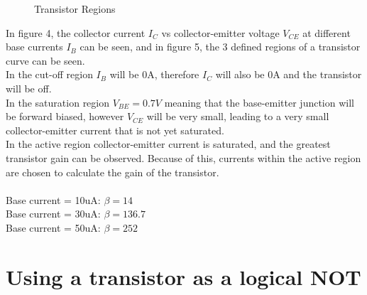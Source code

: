 \documentclass[a4paper,11pt]{article}
\begin{document}
\begin{figure}[h]
\vspace{-20pt}
 \begin{center}
  \vspace{-8pt}
  \caption{Transistor Regions}
  \vspace{-10pt}
 \end{center}
\end{figure}

In figure 4, the collector current $I_C$ vs collector-emitter voltage $V_{CE}$ at different base currents $I_B$ can be seen, and in figure 5, the 3 defined regions of a transistor curve can be seen.\\
In the cut-off region $I_B$ will be 0A, therefore $I_C$ will also be 0A and the transistor will be off. \\
In the saturation region $V_{BE} = 0.7V$ meaning that the base-emitter junction will be forward biased, however $V_{CE}$ will be very small, leading to a very small collector-emitter current that is not yet saturated.\\
In the active region collector-emitter current is saturated, and the greatest transistor gain can be observed. Because of this, currents within the active region are chosen to calculate the gain of the transistor.\\\\
Base current = 10uA: $\beta = 14$\\
Base current = 30uA: $\beta = 136.7$\\
Base current = 50uA: $\beta = 252$\\
\pagebreak

\section{Using a transistor as a logical NOT}
\end{document}
